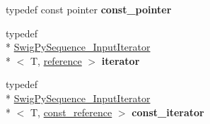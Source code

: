 \begin{DoxyCompactItemize}
\item 
\hypertarget{structswig_1_1_swig_py_sequence___cont_ab4ac20f379a9c7793597569834eb3cf9}{typedef const pointer {\bfseries const\-\_\-pointer}}\label{structswig_1_1_swig_py_sequence___cont_ab4ac20f379a9c7793597569834eb3cf9}

\item 
\hypertarget{structswig_1_1_swig_py_sequence___cont_abcd331d0657a109f34c0fd84c5be87dd}{typedef \\*
\hyperlink{structswig_1_1_swig_py_sequence___input_iterator}{Swig\-Py\-Sequence\-\_\-\-Input\-Iterator}\\*
$<$ T, \hyperlink{structswig_1_1_swig_py_sequence___ref}{reference} $>$ {\bfseries iterator}}\label{structswig_1_1_swig_py_sequence___cont_abcd331d0657a109f34c0fd84c5be87dd}

\item 
\hypertarget{structswig_1_1_swig_py_sequence___cont_a708a6b3790b68aa53bd79d27a2c16b89}{typedef \\*
\hyperlink{structswig_1_1_swig_py_sequence___input_iterator}{Swig\-Py\-Sequence\-\_\-\-Input\-Iterator}\\*
$<$ T, \hyperlink{structswig_1_1_swig_py_sequence___ref}{const\-\_\-reference} $>$ {\bfseries const\-\_\-iterator}}\label{structswig_1_1_swig_py_sequence___cont_a708a6b3790b68aa53bd79d27a2c16b89}

\end{DoxyCompactItemize}
